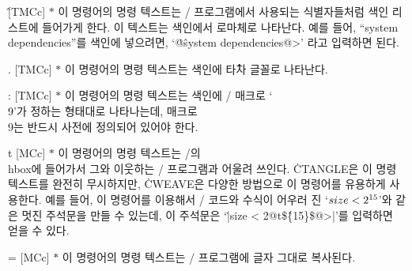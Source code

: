 \@\^ [TMCc] $*$ 이 명령어의 명령 텍스트는 \CEE/
프로그램에서 사용되는 식별자들처럼 색인 리스트에 들어가게 한다. 이 텍스트는 색인에서
로마체로 나타난다. 예를 들어, ``system dependencies''를 색인에
넣으려면, `\.{@\^system dependencies@>}' 라고 입력하면 된다. 

\@. [TMCc] $*$ 이 명령어의 명령 텍스트는 색인에 \.{타자 글꼴}로 나타난다.

\@: [TMCc] $*$ 이 명령어의 명령 텍스트는 색인에 \TEX/ 매크로
`\.{\\9}'가 정하는 형태대로 나타나는데, 매크로 \.{\\9}는 반드시 사전에
정의되어 있어야 한다.

\@{t} [MCc] $*$ 이 명령어의 명령 텍스트는 \TEX/의 \.{\\hbox}에
들어가서 그와 이웃하는 \CEE/ 프로그램과 어울려 쓰인다. \.{CTANGLE}은
이 명령 텍스트를 완전히 무시하지만, \.{CWEAVE}은 다양한 방법으로 이
명령어를 유용하게 사용한다. 예를 들어, 이 명령어를 이용해서 \CEE/ 코드와 수식이
어우러 진 `$\\{size}<2^{15}$'와 같은 멋진 주석문을 만들 수 있는데, 이
주석문은 `\.{|size < 2@t\$\^\{15\}\$@>|}'를 입력하면 얻을 수 있다.

\@= [MCc] $*$ 이 명령어의 명령 텍스트는 \CEE/ 프로그램에 글자 그대로 복사된다.  

